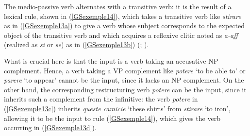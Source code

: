 \eal
 	\label{GSexemple13} 
    \label{GSexemple13a} 
		
	\label{GSexemple13b}
		
	 \label{GSexemple13c} 
		
	\label{GSexemple13d}		
		
	\label{GSexemple13e}			
\zl

\largerpage
\noindent
The medio-passive verb alternates with a transitive verb: it is the result of a lexical rule, shown in (\ref{GSexemple14}), which takes a transitive verb like \emph{stirare} as in (\ref{GSexemple13a}) to give a verb whose subject corresponds to the expected object of the transitive verb and which acquires a reflexive clitic noted as \emph{a-aff} (realized as \emph{si} or \emph{se}) as in (\ref{GSexemple13b}) (\citealt[31]{AGS1998}; \citealt{Monachesi98a}). 

\begin{exe} 
\end{exe}

\noindent
What is crucial here is that the input is a verb taking an accusative NP complement. Hence, a verb
taking a VP complement like  \emph{potere} `to be able to' or \emph{parere} `to appear'
cannot be the input, since it lacks an NP complement. On the other hand, the corresponding
restructuring verb \emph{potere} can be the input, since it inherits such a complement from the
infinitive: the verb \emph{potere} in (\ref{GSexemple13c}) inherits \emph{queste camicie} `these
shirts' from \emph{stirare} `to iron', allowing it to be the input to rule (\ref{GSexemple14}),
which gives the verb occurring in (\ref{GSexemple13d}).

